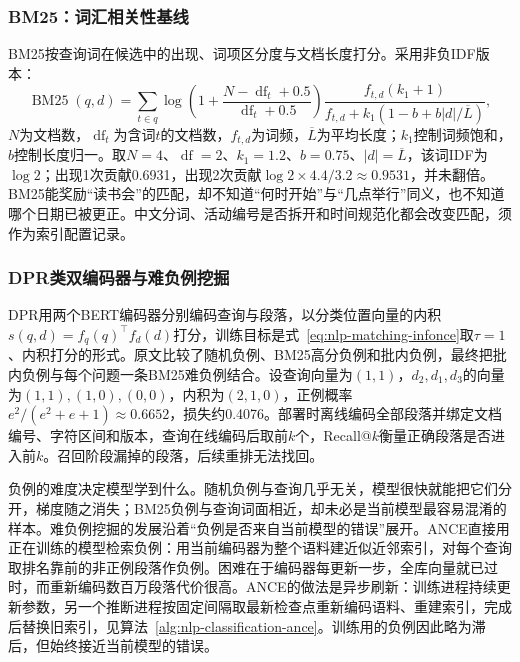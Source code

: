 \subsubsection{BM25：词汇相关性基线}
\label{sec:nlp-classification-bm25}

BM25按查询词在候选中的出现、词项区分度与文档长度打分。采用非负IDF版本：
\[
 \operatorname{BM25}(q,d)=\sum_{t\in q}
 \log\!\left(1+\frac{N-\operatorname{df}_t+0.5}{\operatorname{df}_t+0.5}\right)
 \frac{f_{t,d}(k_1+1)}{f_{t,d}+k_1(1-b+b|d|/\overline L)},
\]
$N$为文档数，$\operatorname{df}_t$为含词$t$的文档数，$f_{t,d}$为词频，$\overline L$为平均长度；$k_1$控制词频饱和，$b$控制长度归一。取$N=4$、$\operatorname{df}=2$、$k_1=1.2$、$b=0.75$、$|d|=\overline L$，该词IDF为$\log2$；出现1次贡献0.6931，出现2次贡献$\log2\times4.4/3.2\approx0.9531$，并未翻倍。BM25能奖励“读书会”的匹配，却不知道“何时开始”与“几点举行”同义，也不知道哪个日期已被更正。中文分词、活动编号是否拆开和时间规范化都会改变匹配，须作为索引配置记录。

\subsubsection{DPR类双编码器与难负例挖掘}
\label{sec:nlp-classification-dpr}

DPR用两个BERT编码器分别编码查询与段落，以分类位置向量的内积$s(q,d)=f_q(q)^\top f_d(d)$打分，训练目标是式~\eqref{eq:nlp-matching-infonce}取$\tau=1$、内积打分的形式。原文比较了随机负例、BM25高分负例和批内负例，最终把批内负例与每个问题一条BM25难负例结合。设查询向量为$(1,1)$，$d_2,d_1,d_3$的向量为$(1,1),(1,0),(0,0)$，内积为$(2,1,0)$，正例概率$e^2/(e^2+e+1)\approx0.6652$，损失约0.4076。部署时离线编码全部段落并绑定文档编号、字符区间和版本，查询在线编码后取前$k$个，Recall@$k$衡量正确段落是否进入前$k$。召回阶段漏掉的段落，后续重排无法找回。

负例的难度决定模型学到什么。随机负例与查询几乎无关，模型很快就能把它们分开，梯度随之消失；BM25负例与查询词面相近，却未必是当前模型最容易混淆的样本。难负例挖掘的发展沿着“负例是否来自当前模型的错误”展开。ANCE直接用正在训练的模型检索负例：用当前编码器为整个语料建近似近邻索引，对每个查询取排名靠前的非正例段落作负例。困难在于编码器每更新一步，全库向量就已过时，而重新编码数百万段落代价很高。ANCE的做法是异步刷新：训练进程持续更新参数，另一个推断进程按固定间隔取最新检查点重新编码语料、重建索引，完成后替换旧索引，见算法~\ref{alg:nlp-classification-ance}。训练用的负例因此略为滞后，但始终接近当前模型的错误。

